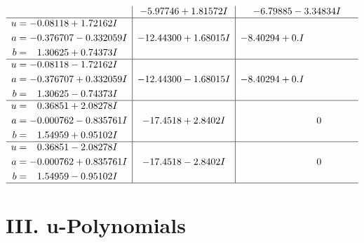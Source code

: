 \documentclass[1p]{elsarticle_modified}
\theoremstyle{definition}
\begin{document}
$$\begin{array}{c|c|c}
 & -5.97746 + 1.81572 I & -6.79885 - 3.34834 I \\ \hline\begin{aligned}
u &= -0.08118 + 1.72162 I \\
a &= -0.376707 - 0.332059 I \\
b &= \phantom{-}1.30625 + 0.74373 I\end{aligned}
 & -12.44300 + 1.68015 I & -8.40294 + 0. I\phantom{ +0.000000I} \\ \hline\begin{aligned}
u &= -0.08118 - 1.72162 I \\
a &= -0.376707 + 0.332059 I \\
b &= \phantom{-}1.30625 - 0.74373 I\end{aligned}
 & -12.44300 - 1.68015 I & -8.40294 + 0. I\phantom{ +0.000000I} \\ \hline\begin{aligned}
u &= \phantom{-}0.36851 + 2.08278 I \\
a &= -0.000762 - 0.835761 I \\
b &= \phantom{-}1.54959 + 0.95102 I\end{aligned}
 & -17.4518 + 2.8402 I & \phantom{-0.000000 } 0 \\ \hline\begin{aligned}
u &= \phantom{-}0.36851 - 2.08278 I \\
a &= -0.000762 + 0.835761 I \\
b &= \phantom{-}1.54959 - 0.95102 I\end{aligned}
 & -17.4518 - 2.8402 I & \phantom{-0.000000 } 0\\
 \hline 
 \end{array}$$\newpage
\newpage\renewcommand{\arraystretch}{1}
\centering \section*{ III. u-Polynomials}
\end{document}
